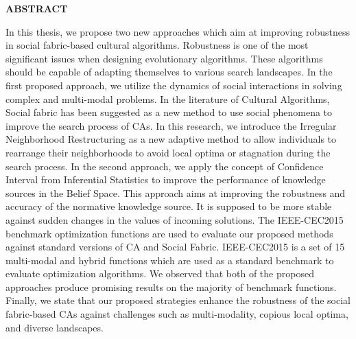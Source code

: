 \newpage
{}


{
	\centering
	\fontsize{17.5}{0}
	\textbf{ABSTRACT}
\par}

In this thesis, we propose two new approaches which aim at improving robustness in social fabric-based cultural algorithms. Robustness is one of the most significant issues when designing evolutionary algorithms. These algorithms should be capable of adapting themselves to various search landscapes. \newline In the first proposed approach, we utilize the dynamics of social interactions in solving complex and multi-modal problems. In the literature of Cultural Algorithms, Social fabric has been suggested as a new method to use social phenomena to improve the search process of CAs. In this research, we introduce the Irregular Neighborhood Restructuring as a new adaptive method to allow individuals to rearrange their neighborhoods to avoid local optima or stagnation during the search process.\newline 
In the second approach, we apply the concept of Confidence Interval from Inferential Statistics to improve the performance of knowledge sources in the Belief Space. This approach aims at improving the robustness and accuracy of the normative knowledge source. It is supposed to be more stable against sudden changes in the values of incoming solutions.\newline 
The IEEE-CEC2015 benchmark optimization functions are used to evaluate our proposed methods against standard versions of CA and Social Fabric. IEEE-CEC2015 is a set of 15 multi-modal and hybrid functions which are used as a standard benchmark to evaluate optimization algorithms. We observed that both of the proposed approaches produce promising results on the majority of benchmark functions. Finally, we state that our proposed strategies enhance the robustness of the social fabric-based CAs against challenges such as multi-modality, copious local optima, and diverse landscapes.